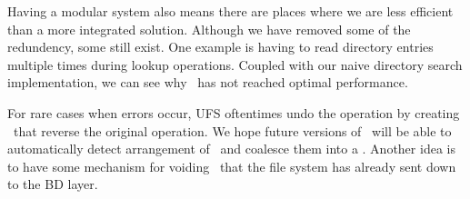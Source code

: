 Having a modular system also means there are places where we are less
efficient than a more integrated solution. Although we have removed some
of the redundency, some still exist. One example is having to read directory
entries multiple times during lookup operations. Coupled with our naive
directory search implementation, we can see why \Kudos\ has not reached
optimal performance.

For rare cases when errors occur, UFS oftentimes undo the operation by
creating \chdescs\ that reverse the original operation. We hope future
versions of \Kudos\  will be able to automatically detect arrangement of
\chdescs\ and coalesce them into a \noop. Another idea is to have some
mechanism for voiding \chdescs\ that the file system has already sent down to
the BD layer.
